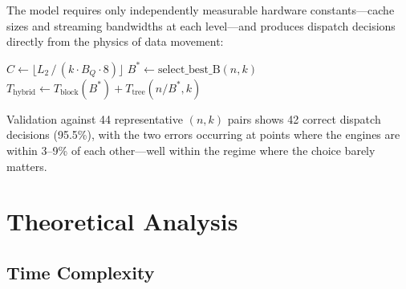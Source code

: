 \documentclass[11pt]{article}
\begin{document}
The model requires only independently measurable hardware constants---cache
sizes and streaming bandwidths at each level---and produces dispatch
decisions directly from the physics of data movement:

\begin{algorithm}[H]
\caption{Roofline Engine Dispatch}\label{alg:dispatch}
\DontPrintSemicolon
\SetAlgoLined
{}
\BlankLine
{}
$C \leftarrow \lfloor L_2 \,/\, (k \cdot B_Q \cdot 8) \rfloor$\;
\BlankLine
{}
\BlankLine
{}
$B^* \leftarrow \text{select\_best\_B}(n, k)$\;
$T_{\text{hybrid}} \leftarrow T_{\text{block}}(B^*) +
  T_{\text{tree}}(n/B^*, k)$\;
\BlankLine
{}
\end{algorithm}

Validation against 44 representative $(n, k)$ pairs shows 42 correct
dispatch decisions (95.5\%), with the two errors occurring at points where
the engines are within 3--9\% of each other---well within the regime where
the choice barely matters.

\section{Theoretical Analysis}\label{sec:theory}

\subsection{Time Complexity}
\end{document}
